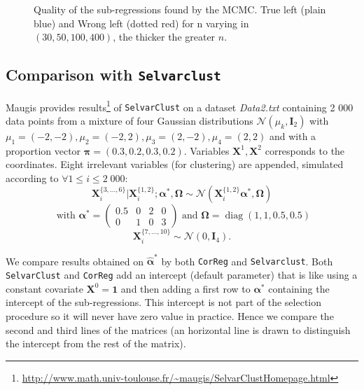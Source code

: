 \documentclass[12pt,a4paper]{report}
\begin{document}
\begin{figure}[h!]
	\caption{Quality of the sub-regressions found by the MCMC. True left (plain blue) and Wrong left (dotted red) for n varying in $(30,50,100,400)$, the thicker the greater $n$.}\label{compZBIC}
\end{figure}


\subsection{Comparison with {\tt Selvarclust}}\label{compMaugis}
		Maugis provides results\footnote{\url{http://www.math.univ-toulouse.fr/~maugis/SelvarClustHomepage.html}} of {\tt SelvarClust} on a dataset {\it Data2.txt} containing 2 000 data points from a mixture of four Gaussian distributions $\mathcal{N}(\mu_k,\boldsymbol{I}_2)$ with $\mu_1=(-2,-2), \mu_2=(-2,2), \mu_3=(2,-2), \mu_4=(2,2)$ and with a proportion vector $\boldsymbol{\pi}=(0.3,0.2,0.3,0.2)$. Variables $\boldsymbol{X}^1,\boldsymbol{X}^2$ corresponds to the coordinates. Eight irrelevant variables (for clustering) are appended, simulated according to $\forall 1\leq i \leq 2\; 000$:
		\begin{displaymath}
		 \boldsymbol{X}_i^{\{3,\dots , 6 \}}|\boldsymbol{X}_i^{\{1,2\}};\boldsymbol{\alpha}^*,\boldsymbol{\Omega} \sim \mathcal{N}(\boldsymbol{X}_i^{\{1,2\}}\boldsymbol{\alpha^*},\boldsymbol{\Omega})
		\end{displaymath}
		\begin{displaymath} \textrm{ with } \boldsymbol{\alpha}^*= \left( \begin{array}{cccc}
		0.5 & 0 & 2 & 0 \\ 
		0 & 1 & 0 & 3
		\end{array} \right) \textrm{ and } \boldsymbol{\Omega}=\operatorname{diag}(1,1,0.5,0.5)
		\end{displaymath}
		\begin{displaymath}
		 \boldsymbol{X}_i^{\{7,\dots , 10 \}}\sim \mathcal{N}(0,\boldsymbol{I}_4).
		\end{displaymath}

We compare results obtained on	$\hat{\boldsymbol{\alpha}}^*$ by both {\tt CorReg} and {\tt Selvarclust}.		
Both {\tt SelvarClust} and {\tt CorReg} add an intercept (default parameter) that is like using a constant covariate $\boldsymbol{X}^0=\boldsymbol{1}$ and then adding a first row to $\boldsymbol{\alpha}^*$ containing the intercept of the sub-regressions. This intercept is not part of the selection procedure so it will never have zero value in practice. Hence we compare the second and third lines of the matrices (an horizontal line is drawn to distinguish the intercept from the rest of the matrix).\\
\end{document}
